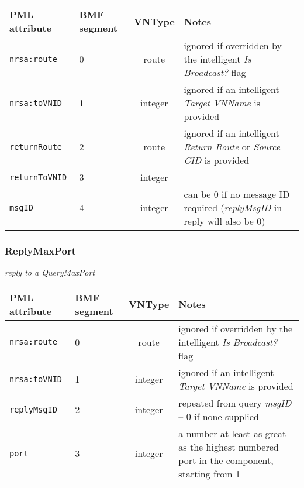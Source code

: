 \documentclass[pdftex,a4paper]{article}
\newcommand{\XMLfont}[1]{{\tt \small #1}}
\begin{document}
\begin{table}[!h]
  \begin{center}
    \label{tab:QueryMaxPort}
    \begin{tabular}{|l|p{13mm}|c|p{60mm}|}
      \hline

      \textbf{PML attribute} & \textbf{BMF segment} & \textbf{VNType}
      & \textbf{Notes} \\\hline

      \XMLfont{nrsa:route} & 0 & route & ignored if overridden by the
      intelligent {\em Is Broadcast?} flag \\\hline

      \XMLfont{nrsa:toVNID} & 1 & integer & ignored if an intelligent {\em
      Target VNName} is provided \\\hline

      \XMLfont{returnRoute} & 2 & route & ignored if an
      intelligent {\em Return Route} or {\em Source CID} is provided
      \\\hline

      \XMLfont{returnToVNID} & 3 & integer & \\\hline

      \XMLfont{msgID} & 4 & integer & can be 0 if no message ID
      required ({\em replyMsgID} in reply will also be 0) \\\hline

    \end{tabular}
  \end{center}
\end{table}


\subsubsection{ReplyMaxPort}
{\em reply to a QueryMaxPort}

\begin{table}[!h]
  \begin{center}
    \label{tab:ReplyMaxPort}
    \begin{tabular}{|l|p{13mm}|c|p{60mm}|}
      \hline

      \textbf{PML attribute} & \textbf{BMF segment} & \textbf{VNType}
      & \textbf{Notes} \\\hline

      \XMLfont{nrsa:route} & 0 & route & ignored if overridden by the
      intelligent {\em Is Broadcast?} flag \\ \hline

      \XMLfont{nrsa:toVNID} & 1 & integer & ignored if an intelligent {\em
      Target VNName} is provided \\\hline

      \XMLfont{replyMsgID} & 2 & integer & repeated from query {\em
      msgID} -- 0 if none supplied \\\hline

      \XMLfont{port} & 3 & integer & a number at least as
      great as the highest numbered port in the component, starting from 1
      \\\hline

    \end{tabular}
  \end{center}
\end{table}
\end{document}
